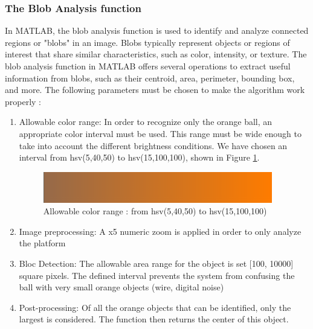   \subsubsection{The Blob Analysis function}
In MATLAB, the blob analysis function is used to identify and analyze connected regions or "blobs" in an image. Blobs typically represent objects or regions of interest that share similar characteristics, such as color, intensity, or texture.
\newline
The blob analysis function in MATLAB offers several operations to extract useful information from blobs, such as their centroid, area, perimeter, bounding box, and more.
\newline
The following parameters must be chosen to make the algorithm work properly : 
\begin{enumerate}
  \item Allowable color range: In order to recognize only the orange ball, an appropriate color interval must be used. This range must be wide enough to take into account the different brightness conditions. We have chosen an interval from hsv(5,40,50) to hsv(15,100,100), shown in Figure \ref{Allowable color range : from hsv(5,40,50) to hsv(15,100,100)}.
  \begin{center}
    \begin{figure}[ht!]
        \centering
        \includegraphics[width=10cm, keepaspectratio]{imports/hsv_grad.png}
        \caption{Allowable color range : from hsv(5,40,50) to hsv(15,100,100)}
        \label{Allowable color range : from hsv(5,40,50) to hsv(15,100,100)}
    \end{figure}
\end{center}
  \item Image preprocessing: A x5 numeric zoom is applied in order to only analyze the platform
  \item Bloc Detection: The allowable area range for the object is set [100, 10000] square pixels. The defined interval prevents the system from confusing the ball with very small orange objects (wire, digital noise)
  \item Post-processing: Of all the orange objects that can be identified, only the largest is considered. The function then returns the center of this object.
\end{enumerate}
